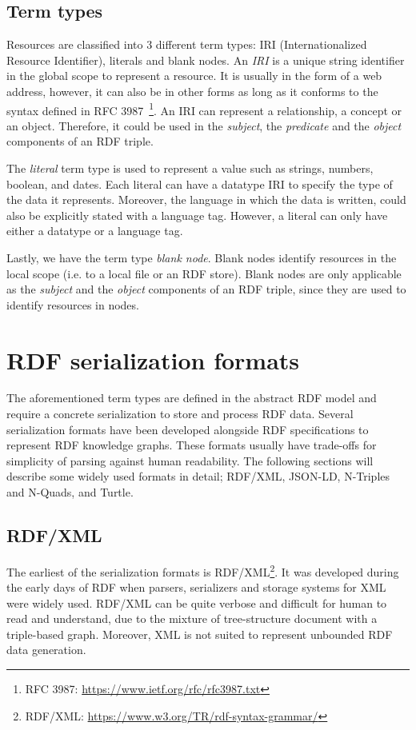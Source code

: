 \subsection{Term types}
Resources are classified into 3 different term types: IRI (Internationalized Resource Identifier),
literals and blank nodes. An \textit{IRI} is a unique string identifier in the global scope to
represent a resource. It is usually in the form of a web address, however, it can
also be in other forms as long as it conforms to the syntax defined in
RFC 3987~\footnote{RFC 3987: \url{https://www.ietf.org/rfc/rfc3987.txt}}.
An IRI can represent a relationship, a concept or an object. Therefore, it could be
used in the \textit{subject}, the \textit{predicate} and the \textit{object} components of
an RDF triple.

The \textit{literal} term type is used to represent a value such as strings, numbers, boolean, and dates.
Each literal can have a datatype IRI to specify the type of the data it represents. Moreover, the
language in which the data is written, could also be explicitly stated with
a language tag. However, a literal can only have either a datatype or a language tag. 

Lastly, we have the term type \textit{blank node}. Blank nodes identify resources
in the local scope (i.e. to a local file or an RDF store).
Blank nodes are only applicable as the \textit{subject}
and the \textit{object} components of an RDF triple, since they are used to
identify resources in nodes.


\section{RDF serialization formats}

The aforementioned term types are defined in the abstract RDF model and 
require a concrete serialization to store and process RDF data. 
Several serialization formats have been developed alongside RDF specifications to represent RDF
knowledge graphs.
These formats usually have trade-offs for simplicity of parsing against 
human readability. The following sections will describe some widely used formats in detail; 
RDF/XML, JSON-LD, N-Triples and N-Quads, and Turtle. 


\subsection{RDF/XML}
The earliest of the serialization formats is RDF/XML\footnote{RDF/XML: \url{https://www.w3.org/TR/rdf-syntax-grammar/}}. 
It was developed during the early days of RDF when parsers, serializers and storage systems 
for XML were widely used. 
RDF/XML can be quite verbose and difficult for human to read and understand, 
due to the mixture of tree-structure document with a triple-based graph. 
Moreover, XML is not suited to represent unbounded RDF data generation.



